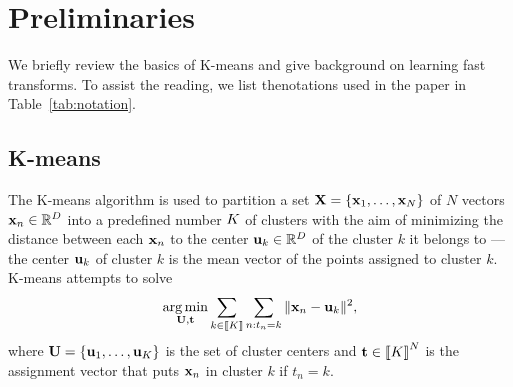\section{Preliminaries}
\label{sec:background}
We briefly review the basics of K-means and
 give background on learning fast transforms.
  To  assist  the  reading,  we  list  thenotations used in the paper in Table~\ref{tab:notation}.









\subsection{K-means}
\label{sec:kmeans}
The K-means algorithm is used to partition a set ${\mathbf{X}}=\{{\mathbf{x}}_1,\ldots,{\mathbf{x}}_N\}$ of $N$  vectors ${\mathbf{x}}_n\in\mathbb{R}^{D}$ into a predefined number $K$ of clusters
with the aim of minimizing the distance between each ${\mathbf{x}}_n$ to the center ${\mathbf{u}}_k\in\mathbb{R}^{D}$
of the cluster $k$ it belongs to ---the center ${\mathbf{u}}_k$ of cluster $k$ is the
 mean vector of the points assigned to cluster $k$.
K-means attempts to solve
\begin{equation}
\label{eq:kmean_problem}
    \operatorname*{arg\,min}_{{\mathbf{U}}, {\mathbf{t}}} \sum_{k\in\left \llbracket K\right \rrbracket} \sum_{n: t_n = k} \|{\mathbf{x}}_{n} -{\mathbf{u}}_{k}\|^2,
\end{equation}
where ${\mathbf{U}}=\{{\mathbf{u}}_1,\ldots,{\mathbf{u}}_K\}$ is the set of cluster centers and ${\mathbf{t}} \in  \left \llbracket K\right \rrbracket^{N}$ is the assignment vector that puts ${\mathbf{x}}_n$ in cluster $k$
if $t_n=k$.


